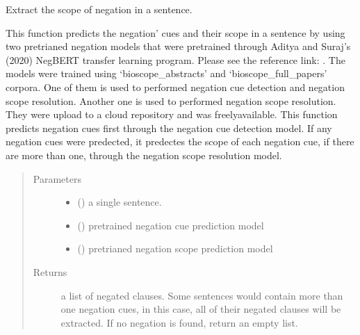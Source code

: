 \documentclass[letterpaper,10pt,english]{sphinxmanual}
\begin{document}
\begin{fulllineitems}
\label{\detokenize{negation_cue_scope:negation_cue_scope.negation_scope}}
\sphinxAtStartPar
Extract the scope of negation in a sentence.

\sphinxAtStartPar
This function predicts the negation’ cues and their scope in a sentence by using two pre\sphinxhyphen{}trianed negation models that were pre\sphinxhyphen{}trained through Aditya and Suraj’s (2020) NegBERT transfer learning program.
Please see the reference link: . The models were trained using ‘bioscope\_abstracts’ and ‘bioscope\_full\_papers’ corpora.
One of them is used to performed negation cue detection and negation scope resolution. Another one is used to performed negation scope resolution. They were upload to a cloud repository and was freely\sphinxhyphen{}available.
This function predicts negation cues first through the negation cue detection model. If any negation cues were predected, it predectes the scope of each negation cue, if there are more than one, through the negation scope resolution model.
\begin{quote}\begin{description}
\item[{Parameters}] \leavevmode\begin{itemize}
\item {} 
\sphinxAtStartPar
{} () \textendash{} a single sentence.

\item {} 
\sphinxAtStartPar
{} () \textendash{} pre\sphinxhyphen{}trained negation cue prediction model

\item {} 
\sphinxAtStartPar
{} () \textendash{} pre\sphinxhyphen{}trianed negation scope prediction model

\end{itemize}

\item[{Returns}] \leavevmode
\sphinxAtStartPar
a list of negated clauses. Some sentences would contain more than one negation cues, in this case, all of their negated clauses will be extracted. If no negation is found, return an empty list.


\end{description}
\end{quote}
\end{fulllineitems}
\end{document}
